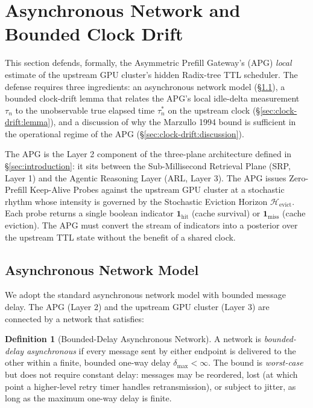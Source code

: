 \documentclass[10pt,twocolumn]{article}
\theoremstyle{definition}
\newtheorem{definition}{Definition}
\theoremstyle{remark}
\begin{document}
\fi

\section{Asynchronous Network and Bounded Clock Drift}
\label{sec:clock-drift}

This section defends, formally, the Asymmetric Prefill Gateway's (APG)
\emph{local} estimate of the upstream GPU cluster's hidden Radix-tree TTL
scheduler. The defense requires three ingredients: an asynchronous network
model (\S\ref{sec:clock-drift:model}), a bounded clock-drift lemma that
relates the APG's local idle-delta measurement $\tau_n$ to the unobservable
true elapsed time $\tau_n^*$ on the upstream clock
(\S\ref{sec:clock-drift:lemma}), and a discussion of why the Marzullo 1994
bound is sufficient in the operational regime of the APG
(\S\ref{sec:clock-drift:discussion}).

The APG is the Layer 2 component of the three-plane architecture defined
in \S\ref{sec:introduction}: it sits between the Sub-Millisecond Retrieval
Plane (SRP, Layer 1) and the Agentic Reasoning Layer (ARL, Layer 3). The
APG issues Zero-Prefill Keep-Alive Probes against the upstream GPU cluster
at a stochastic rhythm whose intensity is governed by the Stochastic
Eviction Horizon $\mathcal{H}_{\text{evict}}$. Each probe returns a single
boolean indicator $\mathbf{1}_{\text{hit}}$ (cache survival) or
$\mathbf{1}_{\text{miss}}$ (cache eviction). The APG must convert the
stream of indicators into a posterior over the upstream TTL state without
the benefit of a shared clock.

\subsection{Asynchronous Network Model}
\label{sec:clock-drift:model}

We adopt the standard asynchronous network model with bounded message
delay. The APG (Layer 2) and the upstream GPU cluster (Layer 3) are
connected by a network that satisfies:

\begin{definition}[Bounded-Delay Asynchronous Network]
\label{def:bounded-network}
A network is \emph{bounded-delay asynchronous} if every message sent by
either endpoint is delivered to the other within a finite, bounded
one-way delay $\delta_{\max} < \infty$. The bound is \emph{worst-case}
but does not require constant delay: messages may be reordered, lost
(at which point a higher-level retry timer handles retransmission), or
subject to jitter, as long as the maximum one-way delay is finite.
\end{definition}
\end{document}
